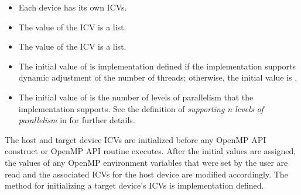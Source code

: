 \comments
\begin{itemize}
\item Each device has its own ICVs.

\item The value of the  ICV is a list. 

\item The value of the  ICV is a list. 

\item The initial value of  is implementation defined if the implementation supports 
dynamic adjustment of the number of threads; otherwise, the initial value is . 

\item The initial value of  is the number of levels of parallelism that 
the implementation supports. See the definition of \emph{supporting n levels of parallelism}
in  for further details.
\end{itemize}

The host and target device ICVs are initialized before any OpenMP API construct or 
OpenMP API routine executes. After the initial values are assigned, the values of any 
OpenMP environment variables that were set by the user are read and the associated 
ICVs for the host device are modified accordingly. The method for initializing a target 
device's ICVs is implementation defined.

